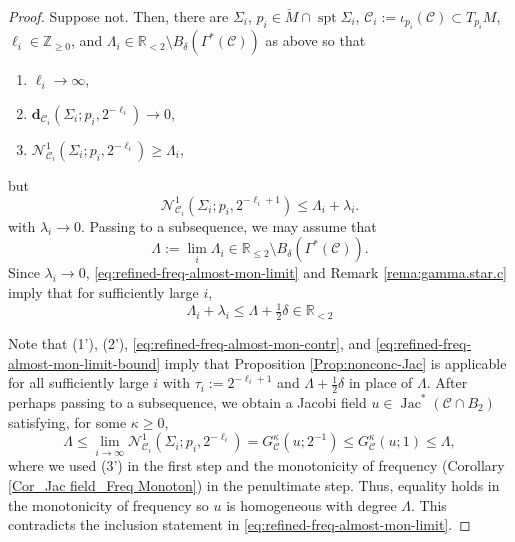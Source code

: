 \documentclass[11pt, letterpaper, reqno]{amsart}
\numberwithin{equation}{section}
\theoremstyle{remark}
\newcommand{\RR}{\mathbb{R}}
\newcommand{\ZZ}{\mathbb{Z}}
\newcommand{\cC}{\mathcal{C}}
\newcommand{\cN}{\mathcal{N}}
\newcommand{\mbfd}{\mathbf{d}}
\newcommand{\spt}{\operatorname{spt}}
\newcommand{\Jac}{\operatorname{Jac}}
\begin{document}
\begin{proof}
Suppose not. Then, there are $\Sigma_i$, $p_i \in \breve M \cap \spt \Sigma_i$, $\cC_i := \iota_{p_i}(\cC) \subset T_{p_i}M$, $\ell_i \in \ZZ_{\geq 0}$, and $\Lambda_i \in \RR_{< 2} \setminus B_\delta(\Gamma^*(\cC))$ as above so that
\begin{enumerate}
\item[(1')] $\ell_i \to \infty$,
\item[(2')] $\mbfd_{\cC_i}(\Sigma_i;p_i,2^{-\ell_i}) \to 0 $, 
\item[(3')] $\cN^{1}_{\cC_i}(\Sigma_i;p_i,2^{-\ell_i}) \geq \Lambda_i$,
\end{enumerate}
but
\begin{equation} \label{eq:refined-freq-almost-mon-contr}
	\cN^{1}_{\cC_i}(\Sigma_i;p_i,2^{-\ell_i+1}) \leq \Lambda_i + \lambda_i.
\end{equation}
with $\lambda_i \to 0$. Passing to a subsequence, we may assume that
\begin{equation} \label{eq:refined-freq-almost-mon-limit}
	\Lambda := \lim_i \Lambda_i \in \RR_{\leq 2} \setminus B_\delta(\Gamma^*(\cC)).
\end{equation}
Since $\lambda_i \to 0$, \eqref{eq:refined-freq-almost-mon-limit} and Remark \ref{rema:gamma.star.c} imply that for sufficiently large $i$,
\begin{equation} \label{eq:refined-freq-almost-mon-limit-bound}
	\Lambda_i + \lambda_i \leq \Lambda + \tfrac12 \delta \in \RR_{< 2}
\end{equation}

Note that (1'), (2'), \eqref{eq:refined-freq-almost-mon-contr}, and \eqref{eq:refined-freq-almost-mon-limit-bound} imply that Proposition \ref{Prop:nonconc-Jac} is applicable for all sufficiently large $i$ with $\tau_i := 2^{-\ell_i+1}$ and $\Lambda + \tfrac12 \delta$ in place of $\Lambda$. After perhaps passing to a subsequence, we obtain a Jacobi field $u \in \Jac^*(\cC \cap B_2)$ satisfying, for some $\kappa \geq 0$,
\[
\Lambda \leq \lim_{i\to\infty}\cN^{1}_{\cC_i}(\Sigma_i;p_i,2^{-\ell_i}) = G^\kappa_{\cC}(u;2^{-1}) \leq G^\kappa_\cC(u;1) \leq \Lambda,
\]
where we used (3') in the first step and the monotonicity of frequency (Corollary \ref{Cor_Jac field_Freq Monoton}) in the penultimate step. Thus, equality holds in the monotonicity of frequency so $u$ is homogeneous with degree $\Lambda$. This contradicts the inclusion statement in \eqref{eq:refined-freq-almost-mon-limit}.
\end{proof}
\end{document}
